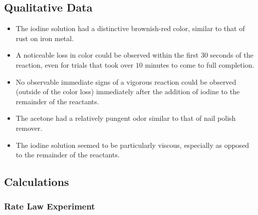 \subsection{Qualitative Data}
\begin{itemize}[itemsep=-1ex]
	  \item The iodine solution had a distinctive brownish-red color, similar to that of rust on iron metal.
	  \item A noticeable loss in color could be observed within the first $30$ seconds of the reaction, even for trials that took over $10$ minutes to come to full completion.
	  \item No observable immediate signs of a vigorous reaction could be observed (outside of the color loss) immediately after the addition of iodine to the remainder of the reactants.
	  \item The acetone had a relatively pungent odor similar to that of nail polish remover.
	  \item The iodine solution seemed to be particularly viscous, especially as opposed to the remainder of the reactants.
	\end{itemize}

\subsection{Calculations}

\subsubsection{Rate Law Experiment}

